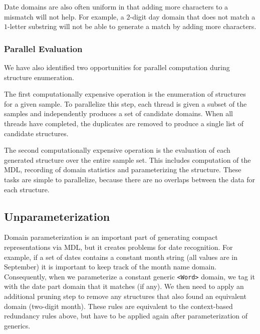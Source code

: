 Date domains are also often uniform in that adding more characters to a mismatch will not help. For example, a $2$-digit day domain that does not match a $1$-letter substring will not be able to generate a match by adding more characters.

\subsubsection{Parallel Evaluation}
We have also identified two opportunities for parallel computation during structure enumeration.

The first computationally expensive operation is the enumeration of structures for a given sample. To parallelize this step, each thread is given a subset of the samples and independently produces a set of candidate domains. When all threads have completed, the duplicates are removed to produce a single list of candidate structures.

The second computationally expensive operation is the evaluation of each generated structure over the entire sample set. This includes computation of the MDL, recording of domain statistics and parameterizing the structure. These tasks are simple to parallelize, because there are no overlaps between the data for each structure.

\subsection{Unparameterization}
Domain parameterization is an important part of generating compact representations via MDL, but it creates problems for date recognition. For example, if a set of dates contains a constant month string (\eg all values are in September) it is important to keep track of the month name domain. Consequently, when we parameterize a constant generic \texttt{<Word>} domain, we tag it with the date part domain that it matches (if any). We then need to apply an additional pruning step to remove any structures that also found an equivalent domain (\eg two-digit month). These rules are equivalent to the context-based redundancy rules above, but have to be applied again after parameterization of generics.

